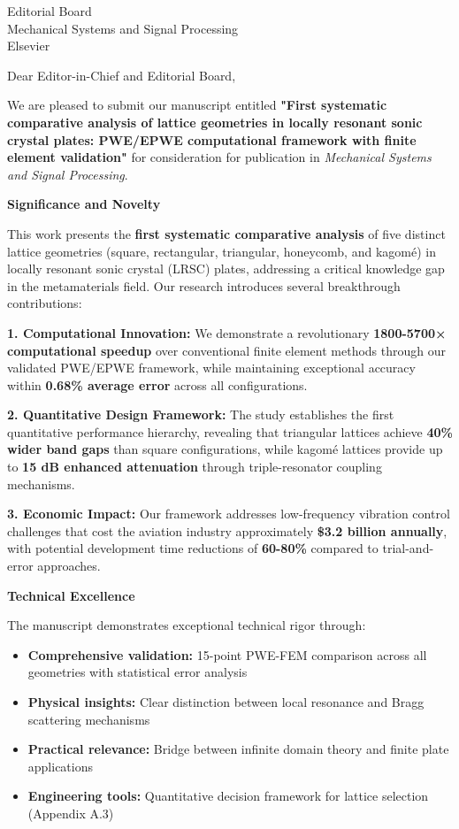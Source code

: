 \documentclass[11pt]{letter}
\begin{document}
\begin{letter}{Editorial Board\\
Mechanical Systems and Signal Processing\\
Elsevier}

\opening{Dear Editor-in-Chief and Editorial Board,}

We are pleased to submit our manuscript entitled \textbf{"First systematic comparative analysis of lattice geometries in locally resonant sonic crystal plates: PWE/EPWE computational framework with finite element validation"} for consideration for publication in \emph{Mechanical Systems and Signal Processing}.

\textbf{Significance and Novelty}

This work presents the \textbf{first systematic comparative analysis} of five distinct lattice geometries (square, rectangular, triangular, honeycomb, and kagomé) in locally resonant sonic crystal (LRSC) plates, addressing a critical knowledge gap in the metamaterials field. Our research introduces several breakthrough contributions:

\textbf{1. Computational Innovation:} We demonstrate a revolutionary \textbf{1800-5700× computational speedup} over conventional finite element methods through our validated PWE/EPWE framework, while maintaining exceptional accuracy within \textbf{0.68\% average error} across all configurations.

\textbf{2. Quantitative Design Framework:} The study establishes the first quantitative performance hierarchy, revealing that triangular lattices achieve \textbf{40\% wider band gaps} than square configurations, while kagomé lattices provide up to \textbf{15 dB enhanced attenuation} through triple-resonator coupling mechanisms.

\textbf{3. Economic Impact:} Our framework addresses low-frequency vibration control challenges that cost the aviation industry approximately \textbf{\$3.2 billion annually}, with potential development time reductions of \textbf{60-80\%} compared to trial-and-error approaches.

\vspace{0.3cm}
\textbf{Technical Excellence}

The manuscript demonstrates exceptional technical rigor through:
\begin{itemize}
\item \textbf{Comprehensive validation:} 15-point PWE-FEM comparison across all geometries with statistical error analysis
\item \textbf{Physical insights:} Clear distinction between local resonance and Bragg scattering mechanisms
\item \textbf{Practical relevance:} Bridge between infinite domain theory and finite plate applications
\item \textbf{Engineering tools:} Quantitative decision framework for lattice selection (Appendix A.3)
\end{itemize}


\end{letter}
\end{document}
